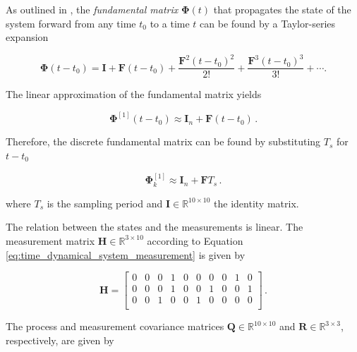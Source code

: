 As outlined in \cite{zarchan2009fundamentals}, the \emph{fundamental matrix} $\bm{\Phi}(t)$ that propagates the state of the system forward from any time $t_0$ to a time $t$ can be found by a Taylor-series expansion 

\begin{equation}
  \bm{\Phi}(t-t_0) = \mathbf{I} + \mathbf{F} (t-t_0) + \frac{\mathbf{F}^2 (t-t_0)^2}{2!} +\frac{\mathbf{F}^{3} (t-t_0)^3}{3!} + \cdots.
\end{equation}
 
\noindent
The linear approximation of the fundamental matrix yields

\begin{equation}
  \bm{\Phi}^{[1]}(t-t_0) \approx \mathbf{I}_n + \mathbf{F} (t-t_0)\,.
\end{equation}

\noindent
Therefore, the discrete fundamental matrix can be found by substituting $T_s$ for $t-t_0$

\begin{equation}
  \bm{\Phi}^{[1]}_{k} \approx \mathbf{I}_{n} + \mathbf{F} T_s\,.
\end{equation}

\noindent
where $T_s$ is the sampling period and $\mathbf{I} \in \mathbb{R}^{10 \times 10}$ the identity matrix. 





The relation between the states and the measurements is linear. The measurement matrix $\mathbf{H} \in \mathbb{R}^{3 \times 10}$ according to Equation \ref{eq:time_dynamical_system_measurement} is given by 

\begin{equation}
\mathbf{H} = \begin{bmatrix}
  0 & 0 & 0 & 1 & 0 & 0 & 0 & 0 & 1 & 0\\
  0 & 0 & 0 & 1 & 0 & 0 & 1 & 0 & 0 & 1\\
  0 & 0 & 1 & 0 & 0 & 1 & 0 & 0 & 0 & 0\\
\end{bmatrix}\,.
\end{equation}

The process and measurement covariance matrices $\mathbf{Q} \in \mathbb{R}^{10 \times 10}$ and $\mathbf{R} \in \mathbb{R}^{3 \times 3}$, respectively, are given by

